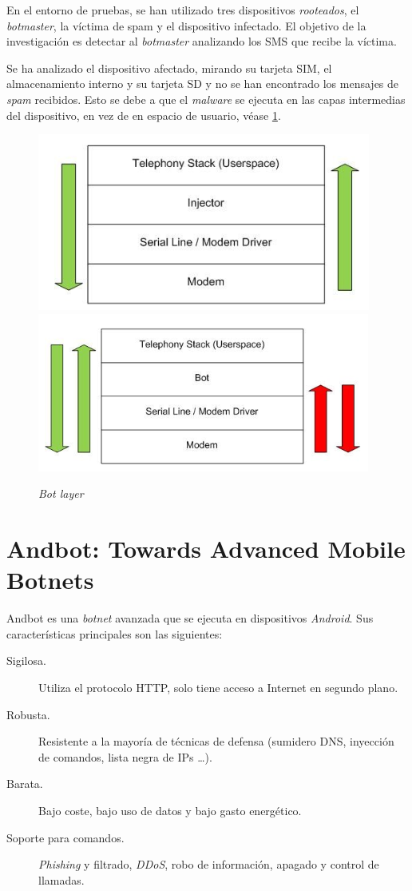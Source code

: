 \documentclass[a4paper,11pt]{report}
\begin{document}
En el entorno de pruebas, se han utilizado tres dispositivos \emph{rooteados}, el \emph{botmaster}, la víctima de spam y el dispositivo infectado. El objetivo de la investigación es detectar al \emph{botmaster} analizando los SMS que recibe la víctima.

Se ha analizado el dispositivo afectado, mirando su tarjeta SIM, el almacenamiento interno y su tarjeta SD y no se han encontrado los mensajes de \emph{spam} recibidos. Esto se debe a que el \emph{malware} se ejecuta en las capas intermedias del dispositivo, en vez de en espacio de usuario, véase \ref{botLayer}.

\begin{figure}[htb]
\begin{center}
\includegraphics[scale=0.8]{previo1}
\includegraphics[scale=0.9]{previo2}
\caption{\emph{Bot layer}}
\label{botLayer}
\end{center}
\end{figure}

\section{Andbot: Towards Advanced Mobile Botnets}

Andbot es una \emph{botnet} avanzada que se ejecuta en dispositivos \emph{Android}. Sus características principales son las siguientes:

\begin{description}
\item[Sigilosa.] Utiliza el protocolo HTTP, solo tiene acceso a Internet en segundo plano.
\item[Robusta.] Resistente a la mayoría de técnicas de defensa (sumidero DNS, inyección de comandos, lista negra de IPs \ldots).
\item[Barata.] Bajo coste, bajo uso de datos y bajo gasto energético.
\item[Soporte para comandos.] \emph{Phishing} y filtrado, \emph{DDoS}, robo de información, apagado y control de llamadas.
\end{description}
\end{document}
